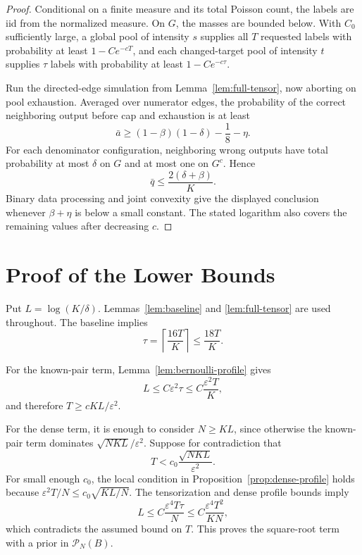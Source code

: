 \documentclass{article}
\newcommand{\cP}{\mathcal P}
\begin{document}
\begin{proof}
Conditional on a finite measure and its total Poisson count, the labels are iid from the normalized measure. On $G$, the masses are bounded below. With $C_0$ sufficiently large, a global pool of intensity $s$ supplies all $T$ requested labels with probability at least $1-Ce^{-cT}$, and each changed-target pool of intensity $t$ supplies $\tau$ labels with probability at least $1-Ce^{-c\tau}$.

Run the directed-edge simulation from Lemma~\ref{lem:full-tensor}, now aborting on pool exhaustion. Averaged over numerator edges, the probability of the correct neighboring output before cap and exhaustion is at least
\[
\bar a\geq(1-\beta)(1-\delta)-\frac18-\eta.
\]
For each denominator configuration, neighboring wrong outputs have total probability at most $\delta$ on $G$ and at most one on $G^c$. Hence
\[
\bar q\leq\frac{2(\delta+\beta)}{K}.
\]
Binary data processing and joint convexity give the displayed conclusion whenever $\beta+\eta$ is below a small constant. The stated logarithm also covers the remaining values after decreasing $c$.
\end{proof}

\section{Proof of the Lower Bounds}

Put $L=\log(K/\delta)$. Lemmas~\ref{lem:baseline} and \ref{lem:full-tensor} are used throughout. The baseline implies
\[
\tau=\left\lceil\frac{16T}{K}\right\rceil\leq\frac{18T}{K}.
\]

For the known-pair term, Lemma~\ref{lem:bernoulli-profile} gives
\[
L\leq C\varepsilon^2\tau\leq C\frac{\varepsilon^2T}{K},
\]
and therefore $T\geq cKL/\varepsilon^2$.

For the dense term, it is enough to consider $N\geq KL$, since otherwise the known-pair term dominates $\sqrt{NKL}/\varepsilon^2$. Suppose for contradiction that
\[
T<c_0\frac{\sqrt{NKL}}{\varepsilon^2}.
\]
For small enough $c_0$, the local condition in Proposition~\ref{prop:dense-profile} holds because $\varepsilon^2T/N\leq c_0\sqrt{KL/N}$. The tensorization and dense profile bounds imply
\[
L\leq C\frac{\varepsilon^4T\tau}{N}
\leq C\frac{\varepsilon^4T^2}{KN},
\]
which contradicts the assumed bound on $T$. This proves the square-root term with a prior in $\cP_N(B)$.
\end{document}
